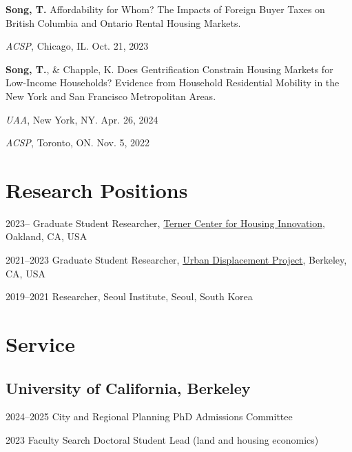 \documentclass[11pt,letterpaper]{article}
\begin{document}
\begin{subpoints}
  \item \textbf{Song, T.} Affordability for Whom? The Impacts of Foreign Buyer Taxes on British Columbia and Ontario Rental Housing Markets.
    \begin{subpoints2}
      \item \emph{ACSP}, Chicago, IL. Oct. 21, 2023
    \end{subpoints2}

  \item \textbf{Song, T.}, \& Chapple, K. Does Gentrification Constrain Housing Markets for Low-Income Households? Evidence from Household Residential Mobility in the New York and San Francisco Metropolitan Areas.
    \begin{subpoints2}
      \item \emph{UAA}, New York, NY. Apr. 26, 2024
      \item \emph{ACSP}, Toronto, ON. Nov. 5, 2022
    \end{subpoints2}
\end{subpoints}

\section{Research Positions}
\begin{tablist}
  \item[2023– ] \tab{}Graduate Student Researcher, \href{https://ternercenter.berkeley.edu/}{Terner Center for Housing Innovation}, Oakland, CA, USA
  \item[2021–2023] \tab{}Graduate Student Researcher, \href{https://www.urbandisplacement.org/}{Urban Displacement Project}, Berkeley, CA, USA
  \item[2019–2021] \tab{}Researcher, Seoul Institute, Seoul, South Korea
\end{tablist}

\section{Service}

\subsection{University of California, Berkeley}
\begin{tablist}
  \item[2024–2025] \tab{}City and Regional Planning PhD Admissions Committee
  \item[2023] \tab{}Faculty Search Doctoral Student Lead (land and housing economics)
\end{tablist}
\end{document}
